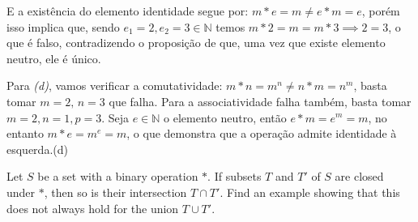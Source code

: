 \begin{solucao}
E a existência do elemento identidade segue por: $m * e = m \neq e * m = e$, porém isso implica que, sendo $e_1 = 2, e_2 = 3 \in \mathbb{N}$ temos $m * 2 = m = m * 3 \implies 2 = 3$, o que é falso, contradizendo o proposição de que, uma vez que existe elemento neutro, ele é único.

Para \textit{(d)}, vamos verificar a comutatividade: \(m * n = m^n \neq n * m = n^m\), basta tomar \(m = 2, \, n = 3\) que falha. Para a associatividade falha também, basta tomar \(m = 2, n = 1, p = 3\). Seja \(e \in \mathbb{N}\) o elemento neutro, então \(e * m = e^m = m\), no entanto \(m * e = m^e = m\), o que demonstra que a operação admite identidade à esquerda.(d)
\end{solucao}

\begin{exercicio}{1.19}
	Let \( S \) be a set with a binary operation \( * \). If subsets \( T \) and \( T' \) of \( S \) are closed under \( * \), then so is their intersection \( T \cap T' \). Find an example showing that this does not always hold for the union \( T \cup T' \).
\end{exercicio}

\begin{solucao}
	
\end{solucao}